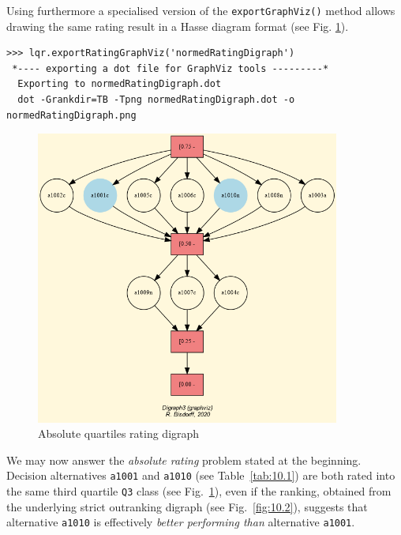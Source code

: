 Using furthermore a specialised version of the \texttt{exportGraphViz()} method allows drawing the same rating result in a Hasse diagram format (see Fig. \ref{fig:10.3}).
\begin{lstlisting}
>>> lqr.exportRatingGraphViz('normedRatingDigraph')
 *---- exporting a dot file for GraphViz tools ---------*
  Exporting to normedRatingDigraph.dot
  dot -Grankdir=TB -Tpng normedRatingDigraph.dot -o normedRatingDigraph.png
\end{lstlisting}
\begin{figure}[h]
\includegraphics[width=10cm]{Figures/normedRatingDigraph.png}
\caption{Absolute quartiles rating digraph}
\label{fig:10.3}       %
\end{figure}

We may now answer the \emph{absolute rating} problem stated at the beginning. Decision alternatives \texttt{a1001} and \texttt{a1010} (see Table~\ref{tab:10.1}) are both rated into the same third quartile \texttt{Q3} class (see Fig.~\ref{fig:10.3}), even if the \Copeland ranking, obtained from the underlying strict outranking digraph (see Fig.~\ref{fig:10.2}), suggests that alternative \texttt{a1010} is effectively \emph{better performing than} alternative \texttt{a1001}. 

